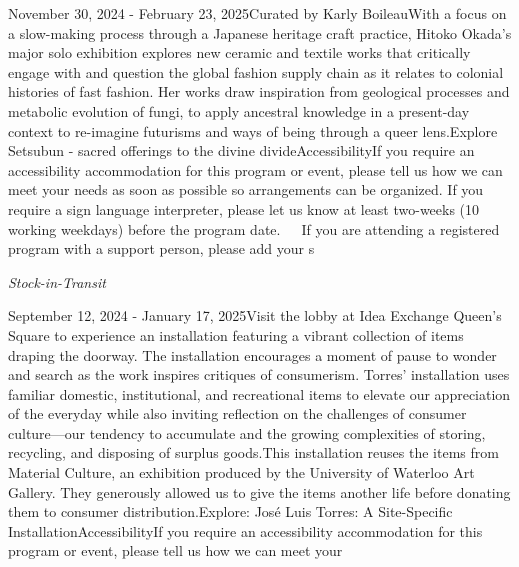 \documentclass[letterpaper, 10pt]{article}
\newcommand{\subtitle}[1]{\textit{\large #1}\vspace{0.5em}}
\newcommand{\articlecontent}[1]{\small #1\vspace{1em}}
\begin{document}
\begin{multicols}{2}
{
\vspace{10px}

November 30, 2024 - February 23, 2025Curated by Karly BoileauWith a focus on a slow-making process through a Japanese heritage craft practice, Hitoko Okada’s major solo exhibition explores new ceramic and textile works that critically engage with and question the global fashion supply chain as it relates to colonial histories of fast fashion. Her works draw inspiration from geological processes and metabolic evolution of fungi, to apply ancestral knowledge in a present-day context to re-imagine futurisms and ways of being through a queer lens.Explore Setsubun - sacred offerings to the divine divideAccessibilityIf you require an accessibility accommodation for this program or event, please tell us how we can meet your needs as soon as possible so arrangements can be organized. If you require a sign language interpreter, please let us know at least two-weeks (10 working weekdays) before the program date.   If you are attending a registered program with a support person, please add your s
}
\vspace{10px}

\subtitle{Stock-in-Transit}

\articlecontent{

\qrcode[height=1.5cm]{https://ideaexchange.libnet.info/event/11807062}
\vspace{10px}

September 12, 2024 - January 17, 2025Visit the lobby at Idea Exchange Queen's Square to experience an installation featuring a vibrant collection of items draping the doorway. The installation encourages a moment of pause to wonder and search as the work inspires critiques of consumerism. Torres’ installation uses familiar domestic, institutional, and recreational items to elevate our appreciation of the everyday while also inviting reflection on the challenges of consumer culture—our tendency to accumulate and the growing complexities of storing, recycling, and disposing of surplus goods.This installation reuses the items from Material Culture, an exhibition produced by the University of Waterloo Art Gallery. They generously allowed us to give the items another life before donating them to consumer distribution.Explore: José Luis Torres: A Site-Specific InstallationAccessibilityIf you require an accessibility accommodation for this program or event, please tell us how we can meet your
}
\vspace{10px}


\end{multicols}
\end{document}
